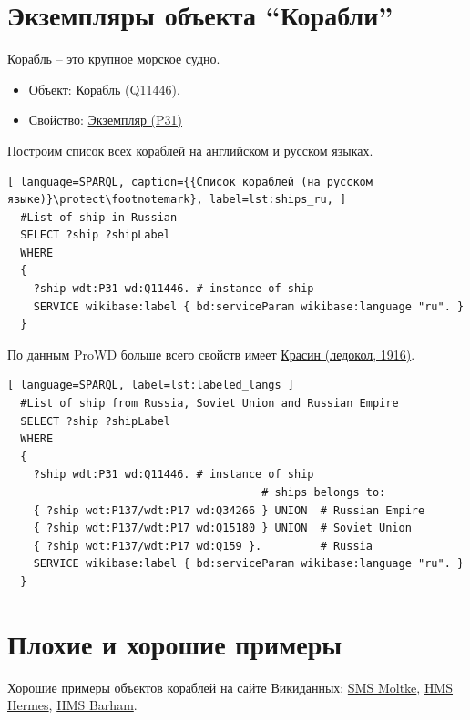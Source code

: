 \section{Экземпляры объекта ``Корабли''}

Корабль -- это крупное морское судно.

\begin{itemize}
  \item Объект: \href{https://www.wikidata.org/wiki/Q11446}{Корабль (Q11446)}.
  \item Свойство: \href{https://www.wikidata.org/wiki/Property:P31}{Экземпляр (P31)}
\end{itemize}

Построим список всех кораблей на английском и русском языках.

\begin{lstlisting}[ language=SPARQL, caption={{Список кораблей (на русском языке)}\protect\footnotemark}, label=lst:ships_ru, ]
  #List of ship in Russian
  SELECT ?ship ?shipLabel
  WHERE
  {
    ?ship wdt:P31 wd:Q11446. # instance of ship
    SERVICE wikibase:label { bd:serviceParam wikibase:language "ru". }
  }
\end{lstlisting}

По данным ProWD больше всего свойств имеет \href{https://www.wikidata.org/wiki/Q281147}{Красин (ледокол, 1916)}.

\begin{lstlisting}[ language=SPARQL, label=lst:labeled_langs ]
  #List of ship from Russia, Soviet Union and Russian Empire
  SELECT ?ship ?shipLabel
  WHERE
  {
    ?ship wdt:P31 wd:Q11446. # instance of ship
                                       # ships belongs to:
    { ?ship wdt:P137/wdt:P17 wd:Q34266 } UNION  # Russian Empire
    { ?ship wdt:P137/wdt:P17 wd:Q15180 } UNION  # Soviet Union
    { ?ship wdt:P137/wdt:P17 wd:Q159 }.         # Russia
    SERVICE wikibase:label { bd:serviceParam wikibase:language "ru". }
  }
\end{lstlisting}

\section{Плохие и хорошие примеры}

Хорошие примеры объектов кораблей на сайте Викиданных: \href{https://www.wikidata.org/wiki/Q613128}{SMS Moltke}, \href{https://www.wikidata.org/wiki/Q596282}{HMS Hermes}, \href{https://www.wikidata.org/wiki/Q596282}{HMS Barham}.

